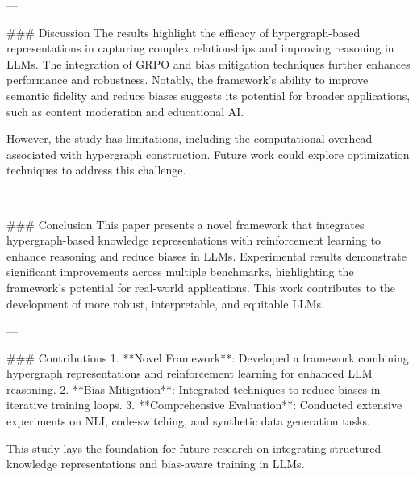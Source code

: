 ---

### Discussion
The results highlight the efficacy of hypergraph-based representations in capturing complex relationships and improving reasoning in LLMs. The integration of GRPO and bias mitigation techniques further enhances performance and robustness. Notably, the framework's ability to improve semantic fidelity and reduce biases suggests its potential for broader applications, such as content moderation and educational AI.

However, the study has limitations, including the computational overhead associated with hypergraph construction. Future work could explore optimization techniques to address this challenge.

---

### Conclusion
This paper presents a novel framework that integrates hypergraph-based knowledge representations with reinforcement learning to enhance reasoning and reduce biases in LLMs. Experimental results demonstrate significant improvements across multiple benchmarks, highlighting the framework's potential for real-world applications. This work contributes to the development of more robust, interpretable, and equitable LLMs.

---

### Contributions
1. **Novel Framework**: Developed a framework combining hypergraph representations and reinforcement learning for enhanced LLM reasoning.
2. **Bias Mitigation**: Integrated techniques to reduce biases in iterative training loops.
3. **Comprehensive Evaluation**: Conducted extensive experiments on NLI, code-switching, and synthetic data generation tasks.

This study lays the foundation for future research on integrating structured knowledge representations and bias-aware training in LLMs.